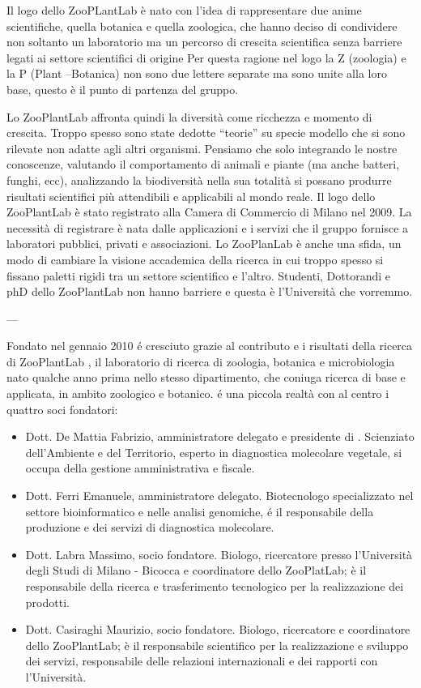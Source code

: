 Il logo dello ZooPLantLab è nato con l’idea di rappresentare due anime scientifiche, quella botanica e quella zoologica, che hanno deciso di condividere non soltanto un laboratorio ma un percorso di crescita scientifica senza barriere legati ai settore scientifici di origine
Per questa ragione nel logo la Z (zoologia) e la P (Plant –Botanica) non sono due lettere separate ma sono unite alla loro base, questo è il punto di partenza del gruppo.

Lo ZooPlantLab affronta quindi la diversità come ricchezza e momento di crescita. Troppo spesso sono state dedotte “teorie” su specie modello che si sono rilevate non adatte agli altri organismi. Pensiamo che solo integrando le nostre conoscenze, valutando il comportamento di animali e piante (ma anche batteri, funghi, ecc), analizzando la biodiversità nella sua totalità si possano produrre risultati scientifici più attendibili e applicabili al mondo reale.
Il logo dello ZooPlantLab è stato registrato alla Camera di Commercio di Milano nel 2009. La necessità di registrare è nata dalle applicazioni e i servizi che il gruppo fornisce a laboratori pubblici, privati e associazioni.
Lo ZooPlanLab è anche una sfida, un modo di cambiare la visione accademica della ricerca in cui troppo spesso si fissano paletti rigidi tra un settore scientifico e l’altro. Studenti, Dottorandi e phD dello ZooPlantLab non hanno barriere e questa è l’Università che vorremmo.


---

Fondato nel gennaio 2010 é cresciuto grazie al contributo e i risultati della ricerca di ZooPlantLab , il laboratorio di ricerca di zoologia, botanica e microbiologia nato qualche anno prima nello stesso dipartimento, che coniuga ricerca di base e applicata, in ambito zoologico e botanico. {\fem} é una piccola realtà con al centro i quattro soci fondatori:
\begin{itemize}
\item Dott. De Mattia Fabrizio, amministratore delegato e presidente di {\femsrl}. Scienziato dell’Ambiente e del Territorio, esperto in diagnostica molecolare vegetale, si occupa della gestione amministrativa e fiscale.
\item Dott. Ferri Emanuele, amministratore delegato. Biotecnologo specializzato nel settore bioinformatico e nelle analisi genomiche, é il responsabile della produzione e dei servizi di diagnostica molecolare.
\item Dott. Labra Massimo, socio fondatore. Biologo, ricercatore presso l’Università degli Studi di Milano - Bicocca e coordinatore dello ZooPlatLab; è il responsabile della ricerca e trasferimento tecnologico per la realizzazione dei prodotti. 
\item Dott. Casiraghi Maurizio, socio fondatore. Biologo, ricercatore e coordinatore dello ZooPlantLab; è il responsabile scientifico per la realizzazione e sviluppo dei servizi, responsabile delle relazioni internazionali e dei rapporti con l’Università.
\end{itemize}

